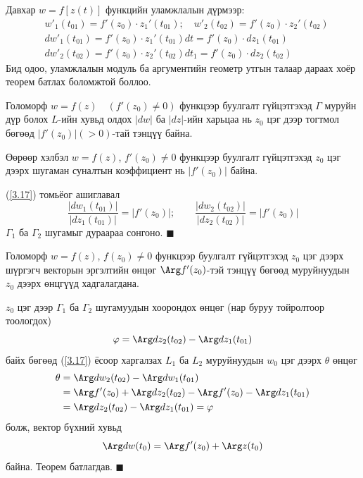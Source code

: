 Давхар $w=f[z(t)]$ функцийн уламжлалын дүрмээр:
\begin{equation} \label{3.17}
  \begin{split}
      &w'_1(t_{01})=f'(z_0)\cdot z_1'(t_{01}); \quad w'_2(t_{02})=f'(z_0)\cdot z_2'(t_{02})\\
      &dw'_1(t_{01})=f'(z_0)\cdot z_1'(t_{01})dt=f'(z_{0})\cdot dz_1(t_{01})\\
      & dw'_2(t_{02})=f'(z_0)\cdot z_2'(t_{02})dt_1=f'(z_0)\cdot dz_2(t_{02})
  \end{split}
\end{equation}
Бид одоо, уламжлалын модуль ба аргументийн геометр утгын талаар дараах хоёр теорем батлах боломжтой боллоо. 
\begin{thm}
Голоморф $w=f(z) \quad (f'(z_0)\neq 0)$ функцээр буулгалт гүйцэтгэхэд $\Gamma$ муруйн дүр болох $L$-ийн хувьд олдох $|dw|$ ба $|dz|$-ийн харьцаа нь $z_0$ цэг дээр тогтмол бөгөөд $|f'(z_0)|(>0)$-тай тэнцүү байна.

Өөрөөр хэлбэл $w=f(z)$, $f'(z_0)\neq 0$ функцээр буулгалт гүйцэтгэхэд $z_0$ цэг дээрх шугаман суналтын коэффициент нь $|f'(z_0)|$ байна.
\end{thm}
\begin{prf}
(\ref{3.17}) томьёог ашиглавал 
$$\frac{|dw_1(t_{01})|}{|dz_1(t_{01})|}=|f'(z_0)|; \qquad \frac{|dw_2(t_{02})|}{|dz_2(t_{02})|}=|f'(z_0)|$$
$\Gamma_1$ ба $\Gamma_2$ шугамыг дураараа сонгоно. 
\hfill $\blacksquare$\end{prf}
\begin{thm}
Голоморф $w=f(z)$, $f(z_0)\ne 0$ функцээр буулгалт гүйцэтгэхэд $z_0$ цэг дээрх шүргэгч векторын эргэлтийн өнцөг $\Arg  f'(z_0)$-тэй тэнцүү бөгөөд муруйнуудын $z_0$ дээрх өнцгүүд хадгалагдана.
\end{thm}
\begin{prf}
 $z_0$ цэг дээр $\Gamma_1$ ба $\Gamma_2$ шугамуудын хоорондох өнцөг (нар буруу тойролтоор тоологдох)
 $$\varphi =\Arg  dz_2(t_{02})-\Arg  dz_1(t_{01})$$
 байх бөгөөд (\ref{3.17}) ёсоор харгалзах $L_1$ ба $L_2$ муруйнуудын $w_0$ цэг дээрх $\theta$ өнцөг
\begin{align*}
    \theta&= \Arg  dw_2(t_{02})-\Arg  dw_1(t_{01}) \\
    &=\Arg  f'(z_0)+\Arg  dz_2(t_{02})-\Arg  f'(z_0)-\Arg  dz_1(t_{01})\\
    &=\Arg  dz_2(t_{02})-\Arg  dz_1(t_{01})=\varphi
\end{align*}
болж, вектор бүхний хувьд
$$\Arg  dw (t_0)=\Arg  f'(z_0)+\Arg  z(t_0)$$
байна. Теорем батлагдав. 
\hfill $\blacksquare$\end{prf}
